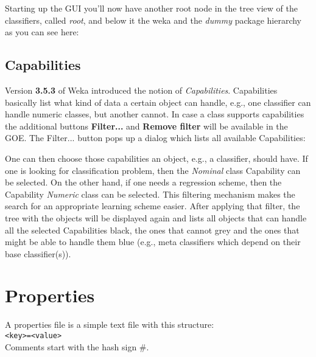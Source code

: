\noindent Starting up the GUI you'll now have another root node in the
tree view of the classifiers, called \textit{root}, and below it the weka and
the \textit{dummy} package hierarchy as you can see here:

\begin{center}
\end{center}

\subsection{Capabilities}
Version \textbf{3.5.3} of Weka introduced the notion of
\textit{Capabilities}. Capabilities basically list what kind of data a
certain object can handle, e.g., one classifier can handle numeric
classes, but another cannot. In case a class supports capabilities the
additional buttons \textbf{Filter...} and \textbf{Remove filter} will
be available in the GOE. The Filter... button pops up a dialog which
lists all available Capabilities:

\begin{center}
\end{center}

\noindent One can then choose those capabilities an object, e.g., a
classifier, should have. If one is looking for classification problem,
then the \textit{Nominal} class Capability can be selected. On the other hand,
if one needs a regression scheme, then the Capability \textit{Numeric} class
can be selected. This filtering mechanism makes the search for an
appropriate learning scheme easier. After applying that filter, the
tree with the objects will be displayed again and lists all objects
that can handle all the selected Capabilities black, the ones that
cannot grey and the ones that might be able to handle them blue (e.g.,
meta classifiers which depend on their base classifier(s)).

\section{Properties}
A properties file is a simple text file with this structure:\\

\verb^<key>=<value>^\\

\noindent Comments start with the hash sign \#.\\


